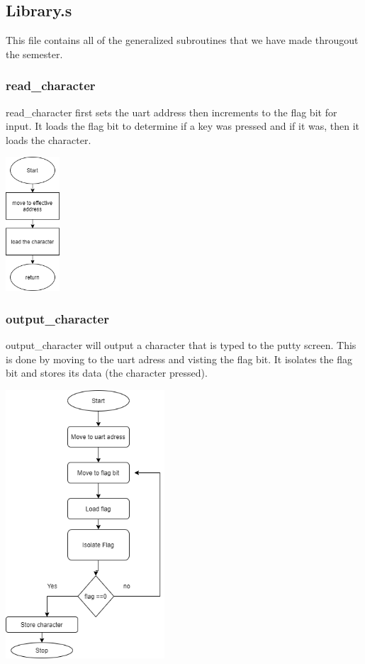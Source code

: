 \documentclass{article}
\begin{document}
\subsection{Library.s}
    This file contains all of the generalized subroutines that we
    have made througout the semester.
    \subsubsection{read\_character}
        read\_character first sets the uart address then increments to the flag bit 
        for input. It loads the flag bit to determine if a key was pressed and if it
        was, then it loads the character.

        \begin{center}
            {\includegraphics[height=5cm]{read_character.png}\centering} 
        \end{center}

    \newpage
    \subsubsection{output\_character}
        output\_character will output a character that is typed to the putty screen. This
        is done by moving to the uart adress and visting the flag bit. It isolates the flag bit and 
        stores its data (the character pressed).
        \begin{center}
            {\includegraphics[height=10cm]{output_char.png}\centering} 
        \end{center}
\end{document}

